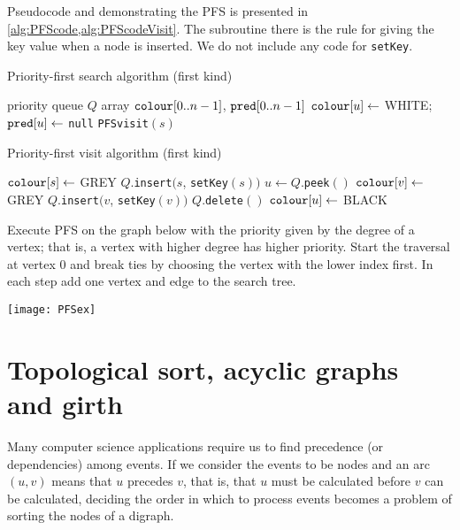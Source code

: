 Pseudocode  and  demonstrating the PFS is presented in \cref{alg:PFScode,alg:PFScodeVisit}. 
The subroutine  there is the rule for giving the key value when a node is inserted. 
We do not include any code for \texttt{setKey}.

\begin{algorithm}[H]
  \caption{Priority-first search algorithm (first kind)}
  \label{alg:PFScode}
\begin{algorithmic}[1]
	\State priority queue $Q$  
	\State array $\operatorname{\text{\texttt{colour}}}[0..n-1]$, $\operatorname{\text{\texttt{pred}}}[0..n-1]$
		\State $\operatorname{\text{\texttt{colour}}}[u] \gets $ WHITE; $\operatorname{\text{\texttt{pred}}}[u] \gets $ \texttt{null}
	\EndFor
			\State \texttt{PFSvisit}$(s)$
		\EndIf
	\EndFor
	\State \Return{$\pred$}
\EndFunction
\end{algorithmic}
\end{algorithm}

\begin{algorithm}[H]
  \caption{Priority-first visit algorithm (first kind)}
  \label{alg:PFScodeVisit}
  \begin{algorithmic}[1]
	\State $\operatorname{\text{\texttt{colour}}}[s] \gets $ GREY 
	\State $Q$.\texttt{insert}$(s$, \texttt{setKey}$(s))$
		\State $u \gets Q$.\texttt{peek}$()$
			\State $\operatorname{\text{\texttt{colour}}}[v] \gets $ GREY
			\State $Q$.\texttt{insert}$(v$, \texttt{setKey}$(v))$
		\Else
			\State $Q$.\texttt{delete}$()$
			\State $\operatorname{\text{\texttt{colour}}}[u] \gets$ BLACK
		\EndIf
	\EndWhile
\EndFunction
\end{algorithmic}
\end{algorithm}

\begin{Boxample}
Execute PFS on the graph below with the priority given by the degree of a vertex; that is, a vertex with higher degree has higher priority. 
Start the traversal at vertex 0 and break ties by choosing the vertex with the lower index first.
In each step add one vertex and edge to the search tree. 
\begin{center}
  \texttt{[image: PFSex]}
\end{center}
\end{Boxample}

\chapter{Topological sort, acyclic graphs and girth} %
Many computer science applications require us to find precedence (or dependencies) among events. 
If we consider the events to be nodes and an arc $(u,v)$ means that $u$ precedes $v$, that is, 
that $u$ must be calculated before $v$ can be calculated, 
deciding the order in which to process events becomes a problem of sorting the nodes of a digraph.

